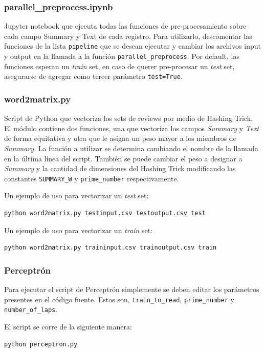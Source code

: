\documentclass[10pt,a4paper]{article}
\begin{document}
\subsubsection{parallel\_preprocess.ipynb}
Jupyter notebook que ejecuta todas las funciones de pre-procesamiento sobre cada campo Summary y Text de cada registro. Para utilizarlo, descomentar las funciones de la lista \texttt{pipeline} que se desean ejecutar y cambiar los archivos input y output en la llamada a la función \texttt{parallel\_preprocess}. Por default, las funciones esperan un \textit{train} set, en caso de querer pre-procesar un \textit{test} set, asegurarse de agregar como tercer parámetro \texttt{test=True}.

\subsubsection{word2matrix.py}
Script de Python que vectoriza los sets de reviews por medio de Hashing Trick. El módulo contiene dos funciones, una que vectoriza los campos \textit{Summary} y \textit{Text} de forma equitativa y otra que le asigna un peso mayor a los miembros de \textit{Summary}.
La función a utilizar se determina cambiando el nombre de la llamada en la última línea del script.
También se puede cambiar el peso a designar a \textit{Summary} y la cantidad de dimensiones del Hashing Trick modificando las constantes \texttt{SUMMARY\_W} y \texttt{prime\_number} respectivamente.

Un ejemplo de uso para vectorizar un \textit{test} set:
\begin{lstlisting}[firstnumber=1]
python word2matrix.py testinput.csv testoutput.csv test
\end{lstlisting}
Un ejemplo de uso para vectorizar un \textit{train} set:
\begin{lstlisting}[firstnumber=1]
python word2matrix.py traininput.csv trainoutput.csv train
\end{lstlisting}

\subsubsection{Perceptrón}
Para ejecutar el script de Perceptrón simplemente se deben editar los parámetros presentes en el código fuente. Estos son, \texttt{train\_to\_read}, \texttt{prime\_number} y \texttt{number\_of\_laps}.

El script se corre de la siguiente manera:

\begin{lstlisting}
python perceptron.py
\end{lstlisting}
\end{document}
